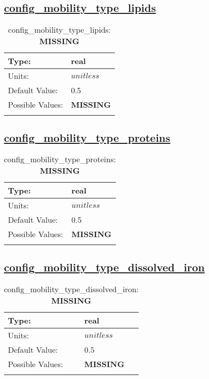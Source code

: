\subsection[config\_mobility\_type\_lipids]{\hyperref[sec:nm_tab_biogeochemistry]{config\_mobility\_type\_lipids}}
\label{subsec:nm_sec_config_mobility_type_lipids}
\begin{center}
\begin{longtable}{| p{2.0in} || p{4.0in} |}
    \hline
    Type: & real \\
    \hline
    Units: & $unitless$ \\
    \hline
    Default Value: & 0.5 \\
    \hline
    Possible Values: & {\bf \color{red} MISSING} \\
    \hline
    \caption{config\_mobility\_type\_lipids: {\bf \color{red} MISSING}}
\end{longtable}
\end{center}
\subsection[config\_mobility\_type\_proteins]{\hyperref[sec:nm_tab_biogeochemistry]{config\_mobility\_type\_proteins}}
\label{subsec:nm_sec_config_mobility_type_proteins}
\begin{center}
\begin{longtable}{| p{2.0in} || p{4.0in} |}
    \hline
    Type: & real \\
    \hline
    Units: & $unitless$ \\
    \hline
    Default Value: & 0.5 \\
    \hline
    Possible Values: & {\bf \color{red} MISSING} \\
    \hline
    \caption{config\_mobility\_type\_proteins: {\bf \color{red} MISSING}}
\end{longtable}
\end{center}
\subsection[config\_mobility\_type\_dissolved\_iron]{\hyperref[sec:nm_tab_biogeochemistry]{config\_mobility\_type\_dissolved\_iron}}
\label{subsec:nm_sec_config_mobility_type_dissolved_iron}
\begin{center}
\begin{longtable}{| p{2.0in} || p{4.0in} |}
    \hline
    Type: & real \\
    \hline
    Units: & $unitless$ \\
    \hline
    Default Value: & 0.5 \\
    \hline
    Possible Values: & {\bf \color{red} MISSING} \\
    \hline
    \caption{config\_mobility\_type\_dissolved\_iron: {\bf \color{red} MISSING}}
\end{longtable}
\end{center}

